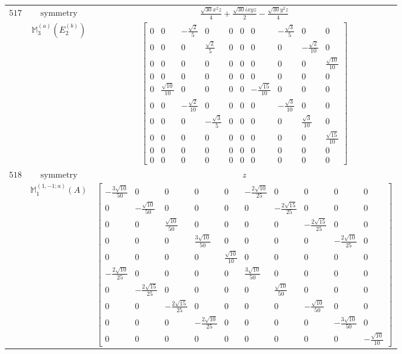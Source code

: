 \documentclass[fleqn,8pt,landscape]{jsarticle}
\begin{document}
\begin{longtable}{ccc}
$ 517 $ & $ \text{symmetry} $ & $ \frac{\sqrt{30} x^{2} z}{4} + \frac{\sqrt{30} i x y z}{2} - \frac{\sqrt{30} y^{2} z}{4} $ \\
$  $ & $ \mathbb{M}_{3}^{(a)}(E_{2}^{(b)}) $ & $ \begin{bmatrix} 0 & 0 & - \frac{\sqrt{2}}{5} & 0 & 0 & 0 & 0 & - \frac{\sqrt{3}}{5} & 0 & 0 \\ 0 & 0 & 0 & \frac{\sqrt{2}}{5} & 0 & 0 & 0 & 0 & - \frac{\sqrt{2}}{10} & 0 \\ 0 & 0 & 0 & 0 & 0 & 0 & 0 & 0 & 0 & \frac{\sqrt{10}}{10} \\ 0 & 0 & 0 & 0 & 0 & 0 & 0 & 0 & 0 & 0 \\ 0 & \frac{\sqrt{10}}{10} & 0 & 0 & 0 & 0 & - \frac{\sqrt{15}}{10} & 0 & 0 & 0 \\ 0 & 0 & - \frac{\sqrt{2}}{10} & 0 & 0 & 0 & 0 & - \frac{\sqrt{3}}{10} & 0 & 0 \\ 0 & 0 & 0 & - \frac{\sqrt{3}}{5} & 0 & 0 & 0 & 0 & \frac{\sqrt{3}}{10} & 0 \\ 0 & 0 & 0 & 0 & 0 & 0 & 0 & 0 & 0 & \frac{\sqrt{15}}{10} \\ 0 & 0 & 0 & 0 & 0 & 0 & 0 & 0 & 0 & 0 \\ 0 & 0 & 0 & 0 & 0 & 0 & 0 & 0 & 0 & 0 \end{bmatrix} $ \\ \hline
$ 518 $ & $ \text{symmetry} $ & $ z $ \\
$  $ & $ \mathbb{M}_{1}^{(1,-1;a)}(A) $ & $ \begin{bmatrix} - \frac{3 \sqrt{10}}{50} & 0 & 0 & 0 & 0 & - \frac{2 \sqrt{10}}{25} & 0 & 0 & 0 & 0 \\ 0 & - \frac{\sqrt{10}}{50} & 0 & 0 & 0 & 0 & - \frac{2 \sqrt{15}}{25} & 0 & 0 & 0 \\ 0 & 0 & \frac{\sqrt{10}}{50} & 0 & 0 & 0 & 0 & - \frac{2 \sqrt{15}}{25} & 0 & 0 \\ 0 & 0 & 0 & \frac{3 \sqrt{10}}{50} & 0 & 0 & 0 & 0 & - \frac{2 \sqrt{10}}{25} & 0 \\ 0 & 0 & 0 & 0 & \frac{\sqrt{10}}{10} & 0 & 0 & 0 & 0 & 0 \\ - \frac{2 \sqrt{10}}{25} & 0 & 0 & 0 & 0 & \frac{3 \sqrt{10}}{50} & 0 & 0 & 0 & 0 \\ 0 & - \frac{2 \sqrt{15}}{25} & 0 & 0 & 0 & 0 & \frac{\sqrt{10}}{50} & 0 & 0 & 0 \\ 0 & 0 & - \frac{2 \sqrt{15}}{25} & 0 & 0 & 0 & 0 & - \frac{\sqrt{10}}{50} & 0 & 0 \\ 0 & 0 & 0 & - \frac{2 \sqrt{10}}{25} & 0 & 0 & 0 & 0 & - \frac{3 \sqrt{10}}{50} & 0 \\ 0 & 0 & 0 & 0 & 0 & 0 & 0 & 0 & 0 & - \frac{\sqrt{10}}{10} \end{bmatrix} $ \\ \hline

\end{longtable}
\end{document}
